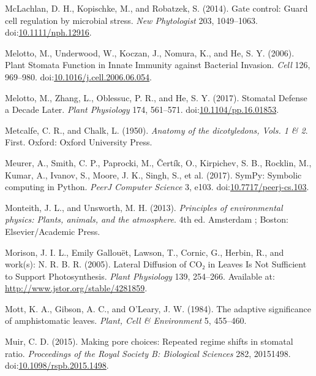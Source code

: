 \documentclass[utf8]{frontiersSCNS}
\begin{document}
\leavevmode\hypertarget{ref-mclachlan_gate_2014}{}%
McLachlan, D. H., Kopischke, M., and Robatzek, S. (2014). Gate control:
Guard cell regulation by microbial stress. \emph{New Phytologist} 203,
1049--1063.
doi:\href{https://doi.org/10.1111/nph.12916}{10.1111/nph.12916}.

\leavevmode\hypertarget{ref-melotto_plant_2006}{}%
Melotto, M., Underwood, W., Koczan, J., Nomura, K., and He, S. Y.
(2006). Plant Stomata Function in Innate Immunity against Bacterial
Invasion. \emph{Cell} 126, 969--980.
doi:\href{https://doi.org/10.1016/j.cell.2006.06.054}{10.1016/j.cell.2006.06.054}.

\leavevmode\hypertarget{ref-melotto_stomatal_2017}{}%
Melotto, M., Zhang, L., Oblessuc, P. R., and He, S. Y. (2017). Stomatal
Defense a Decade Later. \emph{Plant Physiology} 174, 561--571.
doi:\href{https://doi.org/10.1104/pp.16.01853}{10.1104/pp.16.01853}.

\leavevmode\hypertarget{ref-metcalfe_anatomy_1950}{}%
Metcalfe, C. R., and Chalk, L. (1950). \emph{Anatomy of the
dicotyledons, Vols. 1 \& 2}. First. Oxford: Oxford University Press.

\leavevmode\hypertarget{ref-meurer_sympy:_2017}{}%
Meurer, A., Smith, C. P., Paprocki, M., Čertík, O., Kirpichev, S. B.,
Rocklin, M., Kumar, A., Ivanov, S., Moore, J. K., Singh, S., et al.
(2017). SymPy: Symbolic computing in Python. \emph{PeerJ Computer
Science} 3, e103.
doi:\href{https://doi.org/10.7717/peerj-cs.103}{10.7717/peerj-cs.103}.

\leavevmode\hypertarget{ref-monteith_principles_2013}{}%
Monteith, J. L., and Unsworth, M. H. (2013). \emph{Principles of
environmental physics: Plants, animals, and the atmosphere}. 4th ed.
Amsterdam ; Boston: Elsevier/Academic Press.

\leavevmode\hypertarget{ref-morison_lateral_2005}{}%
Morison, J. I. L., Emily Gallouët, Lawson, T., Cornic, G., Herbin, R.,
and work(s): N. R. B. R. (2005). Lateral Diffusion of CO₂ in Leaves Is
Not Sufficient to Support Photosynthesis. \emph{Plant Physiology} 139,
254--266. Available at: \url{http://www.jstor.org/stable/4281859}.

\leavevmode\hypertarget{ref-mott_adaptive_1984}{}%
Mott, K. A., Gibson, A. C., and O'Leary, J. W. (1984). The adaptive
significance of amphistomatic leaves. \emph{Plant, Cell \& Environment}
5, 455--460.

\leavevmode\hypertarget{ref-muir_making_2015}{}%
Muir, C. D. (2015). Making pore choices: Repeated regime shifts in
stomatal ratio. \emph{Proceedings of the Royal Society B: Biological
Sciences} 282, 20151498.
doi:\href{https://doi.org/10.1098/rspb.2015.1498}{10.1098/rspb.2015.1498}.
\end{document}

